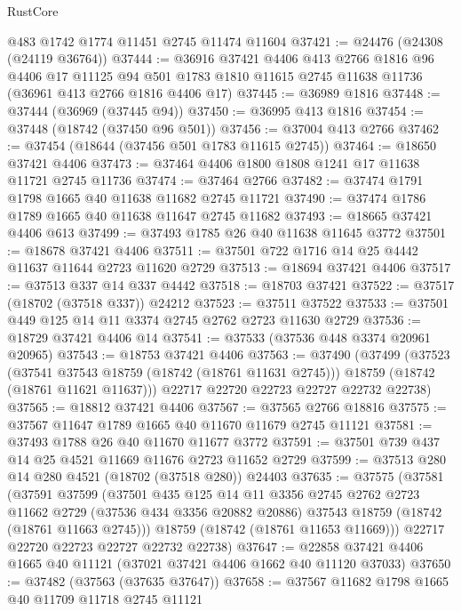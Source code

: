 \begin{lexlean}{RustCore}
\begin{coremodule}
    @483
    @1742
    @1774
    @11451
    @2745
    @11474
    @11604
@37421 := @24476 (@24308 (@24119 @36764))
@37444 := @36916
    @37421
    @4406
    @413
    @2766
    @1816
    @96
    @4406
    @17
    @11125
    @94
    @501
    @1783
    @1810
    @11615
    @2745
    @11638
    @11736
    (@36961 @413 @2766 @1816 @4406 @17)
@37445 := @36989 @1816
@37448 := @37444 (@36969 (@37445 @94))
@37450 := @36995 @413 @1816
@37454 := @37448 (@18742 (@37450 @96 @501))
@37456 := @37004 @413 @2766
@37462 := @37454 (@18644 (@37456 @501 @1783 @11615 @2745))
@37464 := @18650 @37421 @4406
@37473 := @37464 @4406 @1800 @1808 @1241 @17 @11638 @11721 @2745 @11736
@37474 := @37464 @2766
@37482 := @37474 @1791 @1798 @1665 @40 @11638 @11682 @2745 @11721
@37490 := @37474 @1786 @1789 @1665 @40 @11638 @11647 @2745 @11682
@37493 := @18665 @37421 @4406 @613
@37499 := @37493 @1785 @26 @40 @11638 @11645 @3772
@37501 := @18678 @37421 @4406
@37511 := @37501 @722 @1716 @14 @25 @4442 @11637 @11644 @2723 @11620 @2729
@37513 := @18694 @37421 @4406
@37517 := @37513 @337 @14 @337 @4442
@37518 := @18703 @37421
@37522 := @37517 (@18702 (@37518 @337)) @24212
@37523 := @37511 @37522
@37533 := @37501 @449 @125 @14 @11 @3374 @2745 @2762 @2723 @11630 @2729
@37536 := @18729 @37421 @4406 @14
@37541 := @37533 (@37536 @448 @3374 @20961 @20965)
@37543 := @18753 @37421 @4406
@37563 := @37490
    (@37499
      (@37523
        (@37541 @37543 @18759 (@18742 (@18761 @11631 @2745)))
        @18759
        (@18742 (@18761 @11621 @11637)))
      @22717
      @22720
      @22723
      @22727
      @22732
      @22738)
@37565 := @18812 @37421 @4406
@37567 := @37565 @2766 @18816
@37575 := @37567 @11647 @1789 @1665 @40 @11670 @11679 @2745 @11121
@37581 := @37493 @1788 @26 @40 @11670 @11677 @3772
@37591 := @37501 @739 @437 @14 @25 @4521 @11669 @11676 @2723 @11652 @2729
@37599 := @37513 @280 @14 @280 @4521 (@18702 (@37518 @280)) @24403
@37635 := @37575
    (@37581
      (@37591
        @37599
        (@37501
          @435
          @125
          @14
          @11
          @3356
          @2745
          @2762
          @2723
          @11662
          @2729
          (@37536 @434 @3356 @20882 @20886)
          @37543
          @18759
          (@18742 (@18761 @11663 @2745)))
        @18759
        (@18742 (@18761 @11653 @11669)))
      @22717
      @22720
      @22723
      @22727
      @22732
      @22738)
@37647 := @22858 @37421 @4406 @1665 @40 @11121 (@37021 @37421 @4406 @1662 @40 @11120 @37033)
@37650 := @37482 (@37563 (@37635 @37647))
@37658 := @37567 @11682 @1798 @1665 @40 @11709 @11718 @2745 @11121

\end{coremodule}
\end{lexlean}
